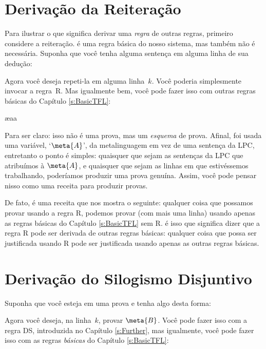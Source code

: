 \section{Derivação da Reiteração}
Para ilustrar o que significa derivar uma   \emph{regra} de outras regras, primeiro considere a reiteração. é uma regra básica do nosso sistema, mas também não é necessária. Suponha que você tenha alguma sentença em alguma linha de sua dedução:
\begin{fitchproof}
\end{fitchproof}
Agora você deseja repeti-la em alguma linha~$k$. Você poderia simplesmente invocar a regra~R. Mas igualmente bem, você pode fazer isso com outras regras básicas do Capítulo \ref{s:BasicTFL}:
\begin{fitchproof}
	\ae{aa}
\end{fitchproof}


Para ser claro: isso não é uma prova, mas um \emph{esquema} de prova. Afinal, foi usada  uma variável, `$\meta{A}$', da metalinguagem  em vez de uma sentença da LPC, entretanto o ponto é simples: quaisquer que sejam as sentenças da LPC que atribuímos à $\meta{A}$, e quaisquer que sejam as linhas em que estivéssemos trabalhando, poderíamos produzir uma  prova genuína. Assim, você pode pensar nisso como uma receita para produzir provas.

De fato, é uma receita que nos mostra o seguinte: qualquer coisa que possamos provar usando a regra R, podemos provar (com mais uma linha) usando apenas as regras básicas do Capítulo \ref{s:BasicTFL} sem R. é isso que significa dizer que a regra R pode ser derivada de outras regras básicas: qualquer coisa que possa ser justificada usando R pode ser justificada usando apenas as outras regras básicas.

\section{Derivação do Silogismo Disjuntivo}
Suponha que você esteja em uma prova e tenha algo desta forma:
\begin{fitchproof}
\end{fitchproof}
Agora você deseja, na linha~$k$, provar $\meta{B}$. Você pode fazer isso com a regra DS, introduzida no Capítulo \ref{s:Further}, mas igualmente, você pode fazer isso com as regras  \emph{básicas} do Capítulo \ref{s:BasicTFL}:
 

